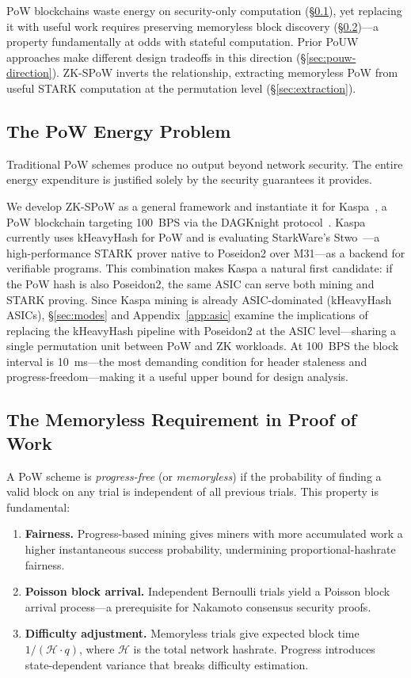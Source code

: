 \documentclass[11pt,a4paper]{article}
\begin{document}
PoW blockchains waste energy on security-only computation (\S\ref{sec:pow-energy}), yet replacing it with useful work requires preserving memoryless block discovery (\S\ref{sec:memoryless})---a property fundamentally at odds with stateful computation. Prior PoUW approaches make different design tradeoffs in this direction (\S\ref{sec:pouw-direction}). ZK-SPoW inverts the relationship, extracting memoryless PoW from useful STARK computation at the permutation level (\S\ref{sec:extraction}).

\subsection{The PoW Energy Problem}
\label{sec:pow-energy}

Traditional PoW schemes produce no output beyond network security. The entire energy expenditure is justified solely by the security guarantees it provides.

We develop ZK-SPoW as a general framework and instantiate it for Kaspa~\cite{kaspa}, a PoW blockchain targeting 100~BPS via the DAGKnight protocol~\cite{dagknight}. Kaspa currently uses kHeavyHash for PoW and is evaluating StarkWare's Stwo~\cite{stwo}---a high-performance STARK prover native to Poseidon2 over M31---as a backend for verifiable programs. This combination makes Kaspa a natural first candidate: if the PoW hash is also Poseidon2, the same ASIC can serve both mining and STARK proving. Since Kaspa mining is already ASIC-dominated (kHeavyHash ASICs), \S\ref{sec:modes} and Appendix~\ref{app:asic} examine the implications of replacing the kHeavyHash pipeline with Poseidon2 at the ASIC level---sharing a single permutation unit between PoW and ZK workloads. At 100~BPS the block interval is 10~ms---the most demanding condition for header staleness and progress-freedom---making it a useful upper bound for design analysis.

\subsection{The Memoryless Requirement in Proof of Work}
\label{sec:memoryless}

A PoW scheme is \emph{progress-free} (or \emph{memoryless}) if the probability of finding a valid block on any trial is independent of all previous trials. This property is fundamental:

\begin{enumerate}
\item \textbf{Fairness.} Progress-based mining gives miners with more accumulated work a higher instantaneous success probability, undermining proportional-hashrate fairness.
\item \textbf{Poisson block arrival.} Independent Bernoulli trials yield a Poisson block arrival process---a prerequisite for Nakamoto consensus security proofs.
\item \textbf{Difficulty adjustment.} Memoryless trials give expected block time $1/(\mathcal{H} \cdot q)$, where $\mathcal{H}$ is the total network hashrate. Progress introduces state-dependent variance that breaks difficulty estimation.
\end{enumerate}
\end{document}
